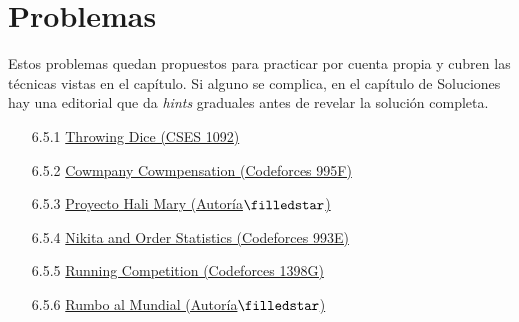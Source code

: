 \section{Problemas}

Estos problemas quedan propuestos para practicar por cuenta propia y cubren las técnicas vistas en el capítulo. Si alguno se complica, en el capítulo de Soluciones hay una editorial que da \textit{hints} graduales antes de revelar la solución completa.

\begin{itemize}
    \item[6.5.1] \href{https://cses.fi/problemset/task/1096}{Throwing Dice (CSES 1092)}
    \item[6.5.2] \href{https://codeforces.com/contest/995/problem/F}{Cowmpany Cowmpensation (Codeforces 995F)}
    \item[6.5.3] \href{https://codeforces.com/group/DH4HPwQlLU/contest/689800/problem/A}{Proyecto Hali Mary (Autoría$\filledstar$)}
    \item[6.5.4] \href{https://codeforces.com/contest/993/problem/E}{Nikita and Order Statistics (Codeforces 993E)}
    \item[6.5.5] \href{https://codeforces.com/contest/1398/problem/G}{Running Competition (Codeforces 1398G)}
    \item[6.5.6]  \href{https://codeforces.com/group/DH4HPwQlLU/contest/689800/problem/B}{Rumbo al Mundial (Autoría$\filledstar$)}
\end{itemize}

